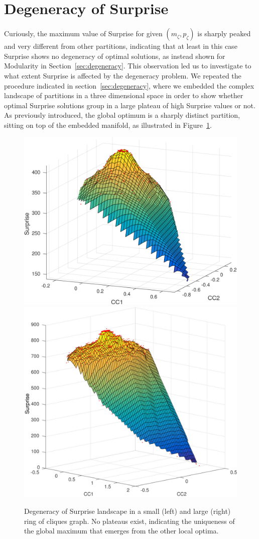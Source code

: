 \section{Degeneracy of Surprise}\label{sec:degeneracy_surprise}
Curiously, the maximum value of Surprise for given $(m_\zeta,p_\zeta)$ is sharply peaked and very different from other partitions, indicating that at least in this case Surprise shows no degeneracy of optimal solutions, as instead shown for Modularity in Section~\ref{sec:degeneracy}.
This observation led us to investigate to what extent Surprise is affected by the degeneracy problem.
We repeated the procedure indicated in section~\ref{sec:degeneracy}, where we embedded the complex landscape of partitions in a three dimensional space in order to show whether optimal Surprise solutions group in a large plateau of high Surprise values or not. As previously introduced, the global optimum is a sharply distinct partition, sitting on top of the embedded manifold, as illustrated in Figure~\ref{fig:degeneracy_surprise}.

\begin{figure}[ht]
\centering
\includegraphics[height=0.4\textwidth]{images/degeneracy_surprise_n_5_c_24.png}\hfill
\includegraphics[height=0.4\textwidth]{images/degeneracy_surprise_n6_c30.png}
\caption{Degeneracy of Surprise landscape in a small (left) and large (right) ring of cliques graph. No plateaus exist, indicating the uniqueness of the global maximum that emerges from the other local optima.}
\label{fig:degeneracy_surprise}
\end{figure}

